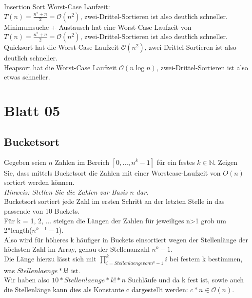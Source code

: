 \documentclass[paper=a4, fontsize=11pt]{scrartcl}
\numberwithin{equation}{section}
\numberwithin{figure}{section}
\numberwithin{table}{section}
\begin{document}
Insertion Sort Worst-Case Laufzeit:\\
$T(n) = \frac{n^2+n}{2} = \mathcal{O}(n^2)$, zwei-Drittel-Sortieren ist also deutlich schneller.\\
Minimumsuche + Austausch hat eine Worst-Case Laufzeit von $T(n) = \frac{n^2+n}{2} = \mathcal{O}(n^2)$, zwei-Drittel-Sortieren ist also deutlich schneller.\\
Quicksort hat die Worst-Case Laufzeit $\mathcal{O}(n^2)$, zwei-Drittel-Sortieren ist also deutlich schneller.\\
Heapsort hat die Worst-Case Laufzeit $\mathcal{O}(n \log n)$, zwei-Drittel-Sortieren ist also etwas schneller.

\newpage
\section{Blatt 05}
\subsection{Bucketsort}
Gegeben seien $n$ Zahlen im Bereich $[0,\dots, n^k-1]$ für ein festes $k\in \mathbb N$.
Zeigen Sie, dass mittels Bucketsort die Zahlen mit einer Worstcase-Laufzeit von $O(n)$ sortiert werden können.\\
\textit{Hinweis: Stellen Sie die Zahlen zur Basis $n$ dar.} \\

Bucketsort sortiert jede Zahl im ersten Schritt an der letzten Stelle in das passende von 10 Buckets.\\
Für k = 1, 2, ... steigen die Längen der Zahlen für jeweiliges n>1 grob um 2*length($n^{k-1} - 1$).\\
Also wird für höheres k häufiger in Buckets einsortiert wegen der Stellenlänge der höchsten Zahl im Array, genau der Stellenanzahl $n^k - 1$.\\
Die Länge hierzu lässt sich mit $\prod_{i=Stellenlaenge von n^k - 1}^{k} i$ bei festem k bestimmen, was $Stellenlaenge * k!$ ist.\\
Wir haben also $10 * Stellenlaenge * k! * n$ Suchläufe und da k fest ist, sowie auch die Stellenlänge kann dies als Konstante c dargestellt werden: $c * n \in \mathcal{O}(n)$.\\


\end{document}
